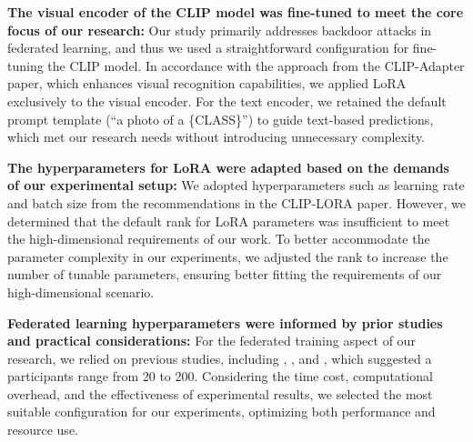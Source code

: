 \documentclass[a4paper,twoside,11pt,dvipsnames]{reviewresponse}
\begin{document}
\textbf{The visual encoder of the CLIP model was fine-tuned to meet the core focus of our research:}
Our study primarily addresses backdoor attacks in federated learning, and thus we used a straightforward configuration for fine-tuning the CLIP model. In accordance with the approach from the CLIP-Adapter\cite{gao2024clip} paper, which enhances visual recognition capabilities, we applied LoRA exclusively to the visual encoder. For the text encoder, we retained the default prompt template (“a photo of a \{CLASS\}”) to guide text-based predictions, which met our research needs without introducing unnecessary complexity.

\textbf{The hyperparameters for LoRA were adapted based on the demands of our experimental setup:}
We adopted hyperparameters such as learning rate and batch size from the recommendations in the CLIP-LORA\cite{zanella2024low} paper. However, we determined that the default rank for LoRA parameters was insufficient to meet the high-dimensional requirements of our work. To better accommodate the parameter complexity in our experiments, we adjusted the rank to increase the number of tunable parameters, ensuring better fitting the requirements of our high-dimensional scenario.

\textbf{Federated learning hyperparameters were informed by prior studies and practical considerations:}
For the federated training aspect of our research, we relied on previous studies, including \cite{wei2023personalized}, \cite{ilhan2023scalefl}, and \cite{wu2023faster}, which suggested a participants range from 20 to 200. Considering the time cost, computational overhead, and  the effectiveness of experimental results, we selected the most suitable configuration for our experiments, optimizing both performance and resource use.





\end{document}
